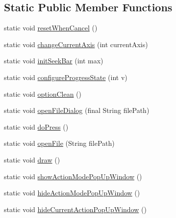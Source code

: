 \subsection*{Static Public Member Functions}
\begin{DoxyCompactItemize}
\item 
static void \hyperlink{classandroid_1_1app_1_1printerapp_1_1viewer_1_1_viewer_main_fragment_aeb698f8835ee7c8f422b45679b36f899}{reset\+When\+Cancel} ()
\item 
static void \hyperlink{classandroid_1_1app_1_1printerapp_1_1viewer_1_1_viewer_main_fragment_ab997dce30b88b0ee9704753174da6d27}{change\+Current\+Axis} (int current\+Axis)
\item 
static void \hyperlink{classandroid_1_1app_1_1printerapp_1_1viewer_1_1_viewer_main_fragment_a8046b17b08a460480a5281e2f9833fd5}{init\+Seek\+Bar} (int max)
\item 
static void \hyperlink{classandroid_1_1app_1_1printerapp_1_1viewer_1_1_viewer_main_fragment_a033ddf25ca148251e2b2fd5a8757e141}{configure\+Progress\+State} (int v)
\item 
static void \hyperlink{classandroid_1_1app_1_1printerapp_1_1viewer_1_1_viewer_main_fragment_a4a9c49253385f0af18d3981107b561b9}{option\+Clean} ()
\item 
static void \hyperlink{classandroid_1_1app_1_1printerapp_1_1viewer_1_1_viewer_main_fragment_aa39eef6fc5817971b51696ca202fdd5e}{open\+File\+Dialog} (final String file\+Path)
\item 
static void \hyperlink{classandroid_1_1app_1_1printerapp_1_1viewer_1_1_viewer_main_fragment_a3cabfc27758fe093b381b798591a98b9}{do\+Press} ()
\item 
static void \hyperlink{classandroid_1_1app_1_1printerapp_1_1viewer_1_1_viewer_main_fragment_ae830a8b71e5df4149f3108f664a3f8ca}{open\+File} (String file\+Path)
\item 
static void \hyperlink{classandroid_1_1app_1_1printerapp_1_1viewer_1_1_viewer_main_fragment_add4692263c7732d9a620fef142486765}{draw} ()
\item 
static void \hyperlink{classandroid_1_1app_1_1printerapp_1_1viewer_1_1_viewer_main_fragment_aeb92c1b1f19f3e62e3395b9b65d038a4}{show\+Action\+Mode\+Pop\+Up\+Window} ()
\item 
static void \hyperlink{classandroid_1_1app_1_1printerapp_1_1viewer_1_1_viewer_main_fragment_a5c6e8dfa0b7dd2fc65c241ab83ed7c78}{hide\+Action\+Mode\+Pop\+Up\+Window} ()
\item 
static void \hyperlink{classandroid_1_1app_1_1printerapp_1_1viewer_1_1_viewer_main_fragment_a2265854f5d3ccd804225a5a6f22560e8}{hide\+Current\+Action\+Pop\+Up\+Window} ()

\end{DoxyCompactItemize}

